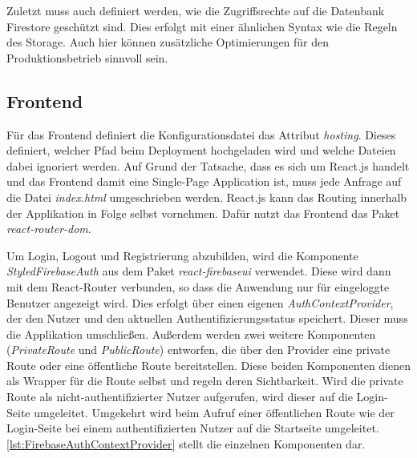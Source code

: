 

Zuletzt muss auch definiert werden, wie die Zugriffsrechte auf die Datenbank Firestore geschützt sind. Dies erfolgt mit einer ähnlichen Syntax wie die Regeln des Storage. Auch hier können zusätzliche Optimierungen für den Produktionsbetrieb sinnvoll sein.

\subsection{Frontend}

Für das Frontend definiert die Konfigurationsdatei das Attribut \textit{hosting}. Dieses definiert, welcher Pfad beim Deployment hochgeladen wird und welche Dateien dabei ignoriert werden. Auf Grund der Tatsache, dass es sich um React.js handelt und das Frontend damit eine Single-Page Application ist, muss jede Anfrage auf die Datei \textit{index.html} umgeschrieben werden. React.js kann das Routing innerhalb der Applikation in Folge selbst vornehmen. Dafür nutzt das Frontend das Paket \textit{react-router-dom}.

Um Login, Logout und Registrierung abzubilden, wird die Komponente \textit{StyledFirebaseAuth} aus dem Paket \textit{react-firebaseui} verwendet. Diese wird dann mit dem React-Router verbunden, so dass die Anwendung nur für eingeloggte Benutzer angezeigt wird. Dies erfolgt über einen eigenen \textit{AuthContextProvider}, der den Nutzer und den aktuellen Authentifizierungsstatus speichert. Dieser muss die Applikation umschließen. Außerdem werden zwei weitere Komponenten (\textit{PrivateRoute} und \textit{PublicRoute}) entworfen, die über den Provider eine private Route oder eine öffentliche Route bereitstellen. Diese beiden Komponenten dienen als Wrapper für die Route selbst und regeln deren Sichtbarkeit. Wird die private Route als nicht-authentifizierter Nutzer aufgerufen, wird dieser auf die Login-Seite umgeleitet. Umgekehrt wird beim Aufruf einer öffentlichen Route wie der Login-Seite bei einem authentifizierten Nutzer auf die Startseite umgeleitet. \autoref{lst:FirebaseAuthContextProvider} stellt die einzelnen Komponenten dar.



